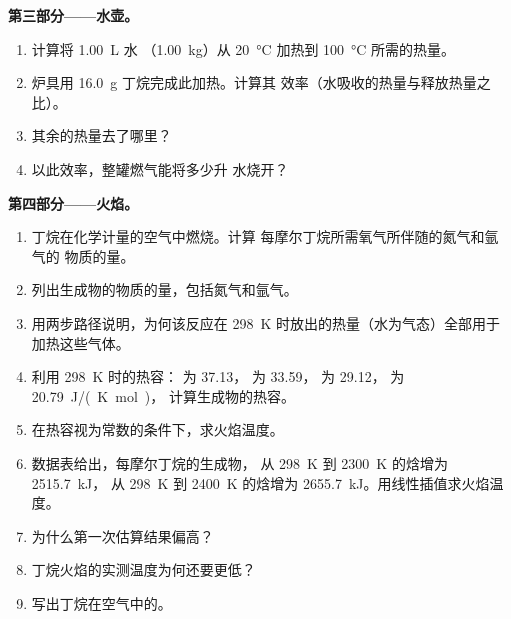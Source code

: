 \begin{problem}
\medskip
\noindent\textbf{第三部分——水壶。}
\begin{enumerate}[resume]
  \item 计算将 \qty{1.00}{L} 水
        （\qty{1.00}{kg}）从 \qty{20}{\celsius} 加热到 \qty{100}{\celsius} 所需的热量。
  \item 炉具用 \qty{16.0}{g} 丁烷完成此加热。计算其
        效率（水吸收的热量与释放热量之比）。
  \item 其余的热量去了哪里？
  \item 以此效率，整罐燃气能将多少升
        水烧开？
\end{enumerate}

\medskip
\noindent\textbf{第四部分——火焰。}
\begin{enumerate}[resume]
  \item 丁烷在化学计量的空气中燃烧。计算
        每摩尔丁烷所需氧气所伴随的氮气和氩气的
        物质的量。
  \item 列出生成物的物质的量，包括氮气和氩气。
  \item 用两步路径说明，为何该反应在
        \qty{298}{K} 时放出的热量（水为气态）全部用于
        加热这些气体。
  \item 利用 \qty{298}{K} 时的热容： 为 37.13，
         为 33.59， 为 29.12， 为 \qty{20.79}{J/(K.mol)}，
        计算生成物的热容。
  \item 在热容视为常数的条件下，求火焰温度。
  \item 数据表给出，每摩尔丁烷的生成物，
        从 \qty{298}{K} 到 \qty{2300}{K} 的焓增为 \qty{2515.7}{kJ}，
        从 \qty{298}{K} 到
        \qty{2400}{K} 的焓增为 \qty{2655.7}{kJ}。用线性插值求火焰温度。
  \item 为什么第一次估算结果偏高？
  \item 丁烷火焰的实测温度为何还要更低？
  \item 写出丁烷在空气中的。
\end{enumerate}
\end{problem}
